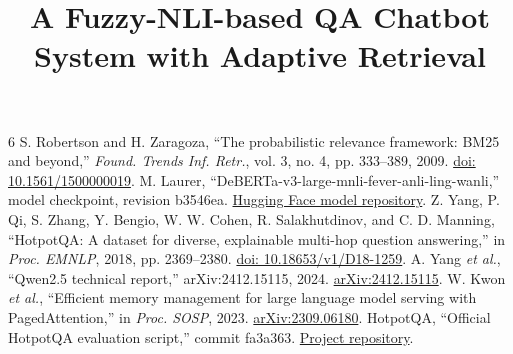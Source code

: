 \documentclass[10pt,journal,letterpaper]{IEEEtran}
\begin{document}
\title{A Fuzzy-NLI-based QA Chatbot System with Adaptive Retrieval}
\author{}
\maketitle
\setcounter{section}{2}

\begin{thebibliography}{6}
S. Robertson and H. Zaragoza, \textquotedblleft The probabilistic relevance framework: BM25 and beyond,\textquotedblright{}
\emph{Found. Trends Inf. Retr.}, vol. 3, no. 4, pp. 333--389, 2009.
\href{https://doi.org/10.1561/1500000019}{doi: 10.1561/1500000019}.
M. Laurer, \textquotedblleft DeBERTa-v3-large-mnli-fever-anli-ling-wanli,\textquotedblright{} model checkpoint, revision b3546ea.
\href{https://huggingface.co/MoritzLaurer/DeBERTa-v3-large-mnli-fever-anli-ling-wanli/tree/b3546ea6b0346eb6f8d5d68b13c7dc6d0376b3d7}{Hugging Face model repository}.
Z. Yang, P. Qi, S. Zhang, Y. Bengio, W. W. Cohen, R. Salakhutdinov, and C. D. Manning,
\textquotedblleft HotpotQA: A dataset for diverse, explainable multi-hop question answering,\textquotedblright{}
in \emph{Proc. EMNLP}, 2018, pp. 2369--2380. \href{https://aclanthology.org/D18-1259/}{doi: 10.18653/v1/D18-1259}.
A. Yang \emph{et al.}, \textquotedblleft Qwen2.5 technical report,\textquotedblright{} arXiv:2412.15115, 2024.
\href{https://arxiv.org/abs/2412.15115}{arXiv:2412.15115}.
W. Kwon \emph{et al.}, \textquotedblleft Efficient memory management for large language model serving with PagedAttention,\textquotedblright{} in \emph{Proc. SOSP}, 2023.
\href{https://arxiv.org/abs/2309.06180}{arXiv:2309.06180}.
HotpotQA, \textquotedblleft Official HotpotQA evaluation script,\textquotedblright{} commit fa3a363.
\href{https://github.com/hotpotqa/hotpot/blob/fa3a36370899e1d85822de61e58c85ea19993154/hotpot_evaluate_v1.py}{Project repository}.
\end{thebibliography}
\end{document}
